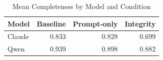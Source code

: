 \begin{table}[htbp]
\centering
\caption{Mean Completeness by Model and Condition}
\label{tab:completeness}
\begin{tabular}{lrrr}
\toprule
Model & Baseline & Prompt-only & Integrity \\
\midrule
Claude & 0.833 & 0.828 & 0.699 \\
Qwen & 0.939 & 0.898 & 0.882 \\
\bottomrule
\end{tabular}
\end{table}
